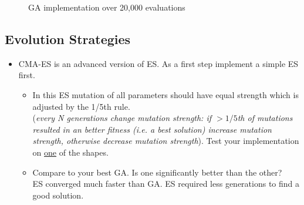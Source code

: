 \documentclass{article}
\begin{document}
\begin{itemize}
\begin{figure}[http]
\begin{subfigure}[b]{.45\linewidth}
		\end{subfigure}
		\caption{GA implementation over 20,000 evaluations}
	\end{figure}
	
\end{itemize}

\newpage
\subsection{Evolution Strategies}
\begin{itemize}
	\item CMA-ES is an advanced version of ES. As a first step implement a simple ES first. 
		\begin{itemize}
			\item In this ES mutation of all parameters should have equal strength which is adjusted by the 1/5th rule.\\(\textit{every N generations change mutation strength: if $>1/5$th of mutations resulted in an better fitness (i.e. a best solution) increase mutation strength, otherwise decrease mutation strength}). Test your implementation on \underline{one} of the shapes.
			\item {Compare to your best GA. Is one significantly better than the other?\\
			\color{blue}
			ES converged much faster than GA. ES required less generations to find a good solution.	}
			\begin{figure}[http]
				

\end{figure}
\end{itemize}
\end{itemize}
\end{document}
